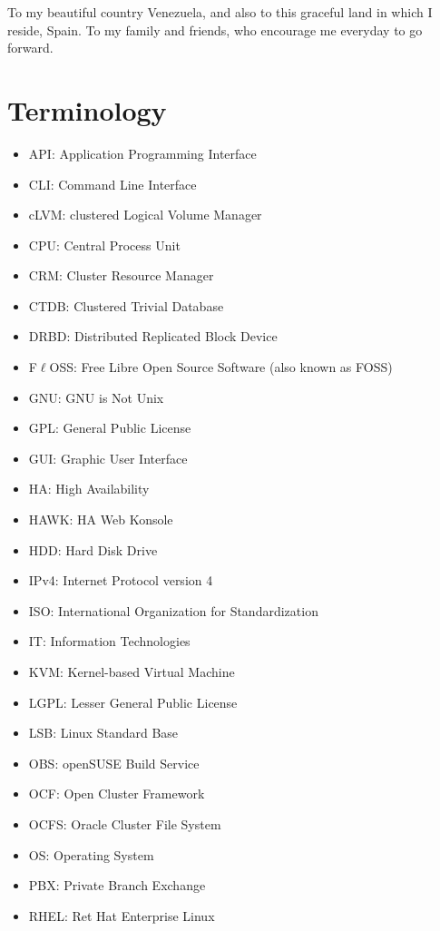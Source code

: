 \documentclass[a4paper, 12pt]{book}
\begin{document}
\noindent To my beautiful country Venezuela, and also to this graceful land in which I reside, Spain. To my family and friends, who encourage me everyday to go forward.


%
\chapter*{Terminology}
\label{chap:terminology}

\begin{itemize}[label={}]
	\item API: Application Programming Interface
	\item CLI: Command Line Interface
	\item cLVM: clustered Logical Volume Manager
	\item CPU: Central Process Unit
	\item CRM: Cluster Resource Manager
	\item CTDB: Clustered Trivial Database
	\item DRBD: Distributed Replicated Block Device
	\item F$\ell$OSS: Free Libre Open Source Software (also known as FOSS)
	\item GNU: GNU is Not Unix
	\item GPL:  General Public License
	\item GUI: Graphic User Interface
	\item HA: High Availability
	\item HAWK: HA Web Konsole
	\item HDD: Hard Disk Drive
	\item IPv4: Internet Protocol version 4
	\item ISO: International Organization for Standardization
	\item IT: Information Technologies
	\item KVM: Kernel-based Virtual Machine
	\item LGPL: Lesser General Public License
	\item LSB: Linux Standard Base
	\item OBS: openSUSE Build Service
	\item OCF: Open Cluster Framework
	\item OCFS: Oracle Cluster File System
	\item OS: Operating System
	\item PBX: Private Branch Exchange
	\item RHEL: Ret Hat Enterprise Linux

\end{itemize}
\end{document}
